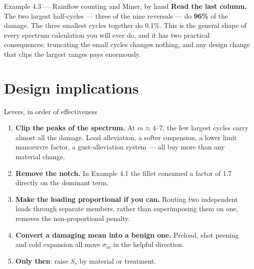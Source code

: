 \documentclass[11pt,a4paper]{article}
\begin{document}
\begin{examplebox}{Example 4.3 --- Rainflow counting and Miner, by hand}
\medskip
\textbf{Read the last column.} The two largest half-cycles --- three of the nine reversals --- do \textbf{96\%} of the damage. The three smallest cycles together do 0.1\%. This is the general shape of every spectrum calculation you will ever do, and it has two practical consequences: truncating the small cycles changes nothing, and any design change that clips the largest ranges pays enormously.
\end{examplebox}

\section{Design implications}

\begin{aerobox}{Levers, in order of effectiveness}
\begin{enumerate}[nosep]
  \item \textbf{Clip the peaks of the spectrum.} At $m\approx4$--7, the few largest cycles carry almost all the damage. Load alleviation, a softer suspension, a lower limit manoeuvre factor, a gust-alleviation system --- all buy more than any material change.
  \item \textbf{Remove the notch.} In Example 4.1 the fillet consumed a factor of 1.7 directly on the dominant term.
  \item \textbf{Make the loading proportional if you can.} Routing two independent loads through separate members, rather than superimposing them on one, removes the non-proportional penalty.
  \item \textbf{Convert a damaging mean into a benign one.} Preload, shot peening and cold expansion all move $\sigma_m$ in the helpful direction.
  \item \textbf{Only then}: raise $S_e$ by material or treatment.
\end{enumerate}
\end{aerobox}
\end{document}
